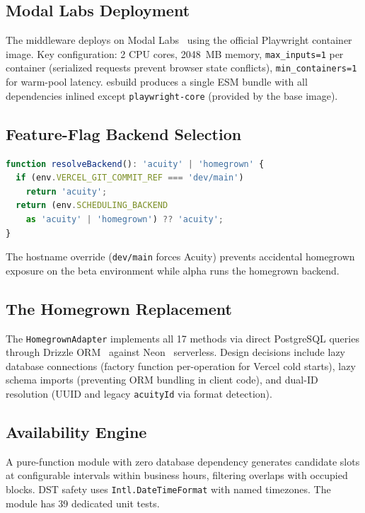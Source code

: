 \documentclass[conference]{IEEEtran}
\begin{document}
\subsection{Modal Labs Deployment}

The middleware deploys on Modal Labs~\cite{modal} using the official Playwright container image. Key configuration: 2 CPU cores, 2048~MB memory, \texttt{max\_inputs=1} per container (serialized requests prevent browser state conflicts), \texttt{min\_containers=1} for warm-pool latency. esbuild produces a single ESM bundle with all dependencies inlined except \texttt{playwright-core} (provided by the base image).

\subsection{Feature-Flag Backend Selection}

\begin{lstlisting}[language=TypeScript,caption={Backend resolution with hostname override (simplified from the SvelteKit consumer application)}]
function resolveBackend(): 'acuity' | 'homegrown' {
  if (env.VERCEL_GIT_COMMIT_REF === 'dev/main')
    return 'acuity';
  return (env.SCHEDULING_BACKEND
    as 'acuity' | 'homegrown') ?? 'acuity';
}
\end{lstlisting}

The hostname override (\texttt{dev/main} forces Acuity) prevents accidental homegrown exposure on the beta environment while alpha runs the homegrown backend.

\subsection{The Homegrown Replacement}

The \texttt{HomegrownAdapter} implements all 17 methods via direct PostgreSQL queries through Drizzle ORM~\cite{drizzle} against Neon~\cite{neon} serverless. Design decisions include lazy database connections (factory function per-operation for Vercel cold starts), lazy schema imports (preventing ORM bundling in client code), and dual-ID resolution (UUID and legacy \texttt{acuityId} via format detection).

\subsection{Availability Engine}

A pure-function module with zero database dependency generates candidate slots at configurable intervals within business hours, filtering overlaps with occupied blocks. DST safety uses \texttt{Intl.DateTimeFormat} with named timezones. The module has 39 dedicated unit tests.
\end{document}
